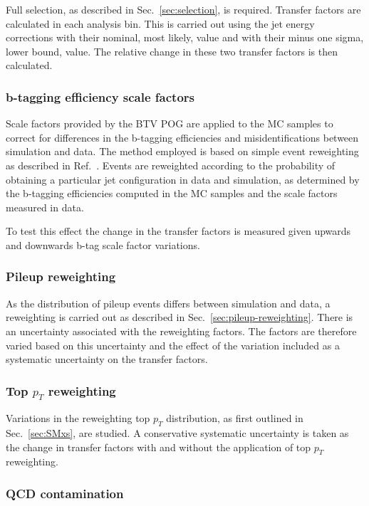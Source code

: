Full selection, as described in Sec.~\ref{sec:selection}, is required.
Transfer factors are
calculated in each analysis bin. This
is carried out using the jet energy corrections with their nominal,
most likely, value and with their minus one sigma, lower bound,
value. The relative change in these two transfer factors is then
calculated. 

\subsubsection{b-tagging efficiency scale factors}

Scale factors provided by the BTV POG are applied to the MC samples
to correct for differences in the b-tagging efficiencies and 
misidentifications between simulation and data. The method employed is
based on simple event reweighting as described in
Ref.~\cite{btagSFMethods}. Events are reweighted according to the
probability of obtaining a particular jet configuration in data
and simulation, as determined by the b-tagging efficiencies computed
in the MC samples and the scale factors measured in data.

To test this effect the change in the transfer factors is measured
given upwards and downwards b-tag scale factor variations.

\subsubsection{Pileup reweighting}

As the distribution of pileup events differs between simulation and
data, a reweighting is carried out as described in
Sec.~\ref{sec:pileup-reweighting}. There is an uncertainty associated
with the reweighting factors. The factors are therefore varied based
on this uncertainty and the effect of the variation included as a
systematic uncertainty on the transfer factors.

\subsubsection{Top $p_T$ reweighting}

Variations in the reweighting top $p_{T}$ distribution, as first outlined in 
Sec.~\ref{sec:SMxs}, are studied. A conservative systematic
uncertainty is taken as the change in transfer
factors with and without the application of top $p_T$ reweighting.

\subsubsection{QCD contamination}

